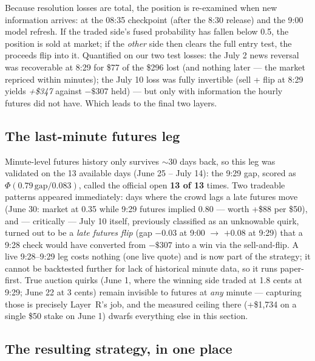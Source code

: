 \documentclass[11pt,a4paper]{article}
\begin{document}
Because resolution losses are total, the position is re-examined when new
information arrives: at the 08:35 checkpoint (after the 8:30 release) and
the 9:00 model refresh. If the traded side's fused probability has fallen
below 0.5, the position is sold at market; if the \emph{other} side then
clears the full entry test, the proceeds flip into it. Quantified on our two
test losses: the July 2 news reversal was recoverable at 8:29 for \$77 of
the \$296 lost (and nothing later --- the market repriced within minutes);
the July 10 loss was fully invertible (sell + flip at 8:29 yields
\emph{+\$347} against $-\$307$ held) --- but only with information the
hourly futures did not have. Which leads to the final two layers.

\subsection{The last-minute futures leg}

Minute-level futures history only survives $\sim$30 days back, so this leg
was validated on the 13 available days (June 25 -- July 14): the 9:29 gap,
scored as $\Phi(0.79\,\text{gap}/0.083)$, called the official open
\textbf{13 of 13} times. Two tradeable patterns appeared immediately: days
where the crowd lags a late futures move (June 30: market at 0.35 while
9:29 futures implied 0.80 --- worth +\$88 per \$50), and --- critically ---
July 10 itself, previously classified as an unknowable quirk, turned out to
be a \emph{late futures flip} (gap $-0.03$ at 9:00 $\to$ $+0.08$ at 9:29)
that a 9:28 check would have converted from $-\$307$ into a win via the
sell-and-flip. A live 9:28--9:29 leg costs nothing (one live quote) and is
now part of the strategy; it cannot be backtested further for lack of
historical minute data, so it runs paper-first. True auction quirks (June 1,
where the winning side traded at 1.8 cents at 9:29; June 22 at 3 cents)
remain invisible to futures at \emph{any} minute --- capturing those is
precisely Layer~R's job, and the measured ceiling there (+\$1{,}734 on a
single \$50 stake on June 1) dwarfs everything else in this section.

\subsection{The resulting strategy, in one place}
\end{document}
